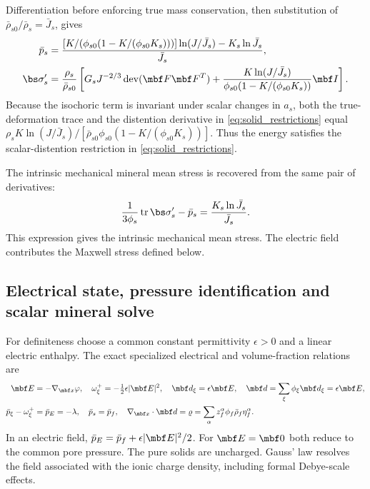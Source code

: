 \documentclass[11pt]{article}
\newcommand{\dev}{\operatorname{dev}}
\begin{document}
Differentiation before enforcing true mass conservation, then substitution of \(\bar\rho_{s0}/\bar\rho_s=\bar J_s\), gives
\begin{align}
 \bar p_s&=\frac{[K/(\phi_{s0}(1-K/(\phi_{s0}K_s)))]\ln(J/\bar J_s)-K_s\ln\bar J_s}{\bar J_s},\label{eq:solid_pressure}\\
 \bs\sigma_s'&=\frac{\rho_s}{\bar\rho_{s0}}\left[
 G_sJ^{-2/3}\dev(\mbf F\mbf F^T)+\frac{K\ln(J/\bar J_s)}{\phi_{s0}(1-K/(\phi_{s0}K_s))}\mbf I\right].\label{eq:solid_single_prime}
\end{align}
Because the isochoric term is invariant under scalar changes in \(a_s\), both the true-deformation trace and the distention derivative in \eqref{eq:solid_restrictions} equal
\(\rho_s K\ln(J/\bar J_s)/[\bar\rho_{s0}\phi_{s0}(1-K/(\phi_{s0}K_s))]\).
Thus the energy satisfies the scalar-distention restriction in \eqref{eq:solid_restrictions}.

The intrinsic mechanical mineral mean stress is recovered from the same pair of derivatives:
\begin{equation}
 \frac{1}{3\phi_s}\operatorname{tr}\bs\sigma_s'-\bar p_s
 =\frac{K_s\ln\bar J_s}{\bar J_s}.
 \label{eq:intrinsic_mineral_mean}
\end{equation}
This expression gives the intrinsic mechanical mean stress. The electric field contributes the Maxwell stress defined below.


\subsection{Electrical state, pressure identification and scalar mineral solve}
For definiteness choose a common constant permittivity \(\epsilon>0\) and a linear electric enthalpy. The exact specialized electrical and volume-fraction relations are
\begin{align}
 \mbf E&=-\nabla_{\mbf x}\varphi,
 \quad \omega_\xi^+=-\tfrac12\epsilon|\mbf E|^2,
 \quad \mbf d_\xi=\epsilon\mbf E,
 \quad \mbf d=\sum_\xi\phi_\xi\mbf d_\xi=\epsilon\mbf E,\label{eq:electric_closure}\\
 \bar p_\xi-\omega_\xi^+&=\bar p_E=-\lambda,
 \quad \bar p_s=\bar p_f,
 \quad \nabla_{\mbf x}\cdot\mbf d=\varrho
 =\sum_\alpha z_f^\alpha\phi_f\bar\rho_f\eta_f^\alpha.\label{eq:pressure_gauss}
\end{align}
In an electric field, \(\bar p_E=\bar p_f+\epsilon|\mbf E|^2/2\). For \(\mbf E=\mbf0\) both reduce to the common pore pressure. The pure solids are uncharged. Gauss’ law resolves the field associated with the ionic charge density, including formal Debye-scale effects.
\end{document}
